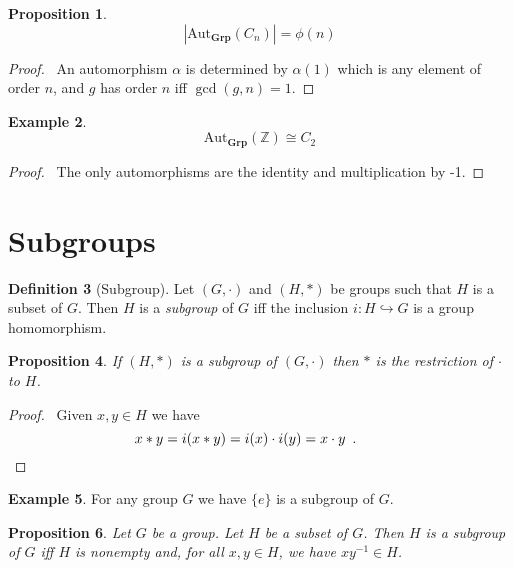 \documentclass{book}
\let\qed\relax
\newtheorem{prop}{Proposition}[chapter]
\theoremstyle{definition}
\newtheorem{df}[prop]{Definition}
\newtheorem{ex}[prop]{Example}
\newcommand{\Aut}[2]{\ensuremath{\mathrm{Aut}_{#1} \left( {#2} \right)}}
\newcommand{\Grp}{\ensuremath{\mathbf{Grp}}}
\newcommand{\inv}[1]{\ensuremath{{#1}^{-1}}}
\begin{document}
\begin{prop}
    \[ |\Aut{\Grp}{C_n}| = \phi(n) \]
\end{prop}

\begin{proof}
    \pf\ An automorphism $\alpha$ is determined by $\alpha(1)$ which is any element of order $n$, and $g$ has order $n$ iff $\gcd(g,n) = 1$. \qed
\end{proof}

\begin{ex}
    \[ \Aut{\Grp}{\mathbb{Z}} \cong C_2 \]
\end{ex}

\begin{proof}
    \pf\ The only automorphisms are the identity and multiplication by -1. \qed
\end{proof}

\section{Subgroups}

\begin{df}[Subgroup]
Let $(G,\cdot)$ and $(H,*)$ be groups such that $H$ is a subset of $G$. Then $H$ is a \emph{subgroup} of $G$ iff the inclusion $i : H \hookrightarrow G$ is a group homomorphism.
\end{df}

\begin{prop}
If $(H,*)$ is a subgroup of $(G,\cdot)$ then $*$ is the restriction of $\cdot$ to $H$.
\end{prop}

\begin{proof}
\pf\ Given $x,y \in H$ we have
\[ x * y = i(x * y) = i(x) \cdot i(y) = x \cdot y \enspace .  \qquad \qed \]
\end{proof}

\begin{ex}
For any group $G$ we have $\{e\}$ is a subgroup of $G$.
\end{ex}

\begin{prop}
Let $G$ be a group. Let $H$ be a subset of $G$. Then $H$ is a subgroup of $G$ iff $H$ is nonempty and, for all $x,y \in H$, we have $x \inv{y} \in H$.
\end{prop}
\end{document}

